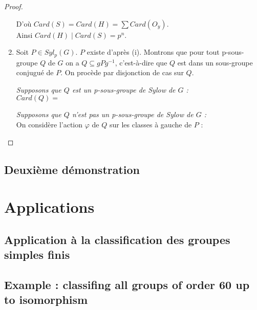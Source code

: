 \documentclass[french]{article}
\theoremstyle{definition}
\theoremstyle{plain}
\theoremstyle{plain}
\theoremstyle{plain}
\theoremstyle{plain}
\theoremstyle{plain}
\begin{document}
\begin{proof}
\begin{enumerate}[label={\upshape(\roman*)}]
D'où \( Card(S) = Card(H) = \sum Card(O_{y}) \). \\
Ainsi \( Card(H) \mid Card(S) = p^{n} \).

\item Soit \( P \in Syl_{p}({G}) \). \( P \) existe d'après (i). Montrons que pour tout p-sous-groupe \( Q \) de \( G \) on a \( Q \subseteq gPg^{-1} \), c'est-à-dire que \( Q \) est dans un sous-groupe conjugué de \( P \). On procède par disjonction de cas sur \( Q \).
	\par \textit{Supposons que \( Q \) est un p-sous-groupe de Sylow de \( G \) :}\\
	\( Card(Q) =  \)
	
	\par \textit{Supposons que \( Q \) n'est pas un p-sous-groupe de Sylow de \( G \) :}\\ On considère l'action \( \varphi \) de \( Q \) sur les classes à gauche de \( P \) :

	\end{enumerate}
\end{proof}


\subsection{Deuxième démonstration}


\clearpage
\section{Applications}
\subsection{Application à la classification des groupes simples finis}

\cite{dummit2003abstract}

\subsection{Example : classifing all groups of order 60 up to isomorphism}


\clearpage

\printbibliography
\end{document}
